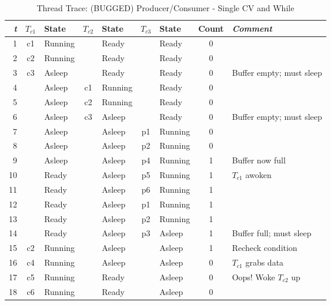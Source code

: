 \documentclass{article}
\begin{document}
\begin{table}[h!]
    \begin{center}
        \caption*{Thread Trace: (BUGGED) Producer/Consumer - Single CV and While}
        \label{tab:table1}
        \begin{tabular}{r|cl|cl|cl|c|l}
            \textit{t} & $T_{c1}$ & State & $T_{c2}$ & State & $T_{c3}$ & State & Count & \textit{Comment}\\
            \hline
            1  & c1 & Running &    & Ready   &    & Ready   & 0 &  \\
            2  & c2 & Running &    & Ready   &    & Ready   & 0 &  \\
            3  & c3 & Asleep  &    & Ready   &    & Ready   & 0 &  Buffer empty; must sleep \\  \hline
            4  &    & Asleep  & c1 & Running &    & Ready   & 0 &  \\
            5  &    & Asleep  & c2 & Running &    & Ready   & 0 &  \\
            6  &    & Asleep  & c3 & Asleep  &    & Ready   & 0 &  Buffer empty; must sleep \\  \hline
            7  &    & Asleep  &    & Asleep  & p1 & Running & 0 &  \\
            8  &    & Asleep  &    & Asleep  & p2 & Running & 0 &  \\
            9  &    & Asleep  &    & Asleep  & p4 & Running & 1 &  Buffer now full \\
            10 &    & Ready   &    & Asleep  & p5 & Running & 1 &  $T_{c1}$ awoken \\
            11 &    & Ready   &    & Asleep  & p6 & Running & 1 &  \\
            12 &    & Ready   &    & Asleep  & p1 & Running & 1 &  \\
            13 &    & Ready   &    & Asleep  & p2 & Running & 1 &  \\
            14 &    & Ready   &    & Asleep  & p3 & Asleep  & 1 &  Buffer full; must sleep \\  \hline
            15 & c2 & Running &    & Asleep  &    & Asleep  & 1 &  Recheck condition \\
            16 & c4 & Running &    & Asleep  &    & Asleep  & 0 &  $T_{c1}$ grabs data \\
            17 & c5 & Running &    & Ready   &    & Asleep  & 0 &  Oops! Woke $T_{c2}$ up \\
            18 & c6 & Running &    & Ready   &    & Asleep  & 0 &  \\

\end{tabular}
\end{center}
\end{table}
\end{document}
